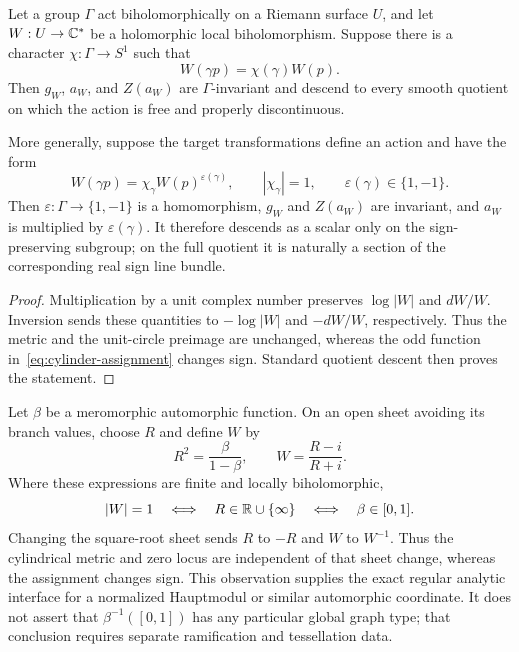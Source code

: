 \begin{proposition}
\label{prop:cylinder-automorphic-descent}
Let a group \(\Gamma\) act biholomorphically on a Riemann surface \(U\), and let
\(W:U\to\mathbb{C}^*\) be a holomorphic local biholomorphism.  Suppose there is a character
\(\chi:\Gamma\to S^1\) such that
\begin{equation}\label{eq:cylinder-unitary-automorphy}
 W(\gamma p)=\chi(\gamma)W(p).
\end{equation}
Then \(g_W\), \(a_W\), and \(Z(a_W)\) are \(\Gamma\)-invariant and descend to every
smooth quotient on which the action is free and properly discontinuous.

More generally, suppose the target transformations define an action and have the
form
\begin{equation}\label{eq:cylinder-dihedral-automorphy}
 W(\gamma p)=\chi_\gamma W(p)^{\varepsilon(\gamma)},
 \qquad
 |\chi_\gamma|=1,
 \qquad
 \varepsilon(\gamma)\in\{1,-1\}.
\end{equation}
Then \(\varepsilon:\Gamma\to\{1,-1\}\) is a homomorphism, \(g_W\) and
\(Z(a_W)\) are invariant, and \(a_W\) is multiplied by \(\varepsilon(\gamma)\).
It therefore descends as a scalar only on the sign-preserving subgroup; on the full
quotient it is naturally a section of the corresponding real sign line bundle.
\end{proposition}

\begin{proof}
Multiplication by a unit complex number preserves \(\log|W|\) and \(dW/W\).
Inversion sends these quantities to \(-\log|W|\) and \(-dW/W\), respectively.
Thus the metric and the unit-circle preimage are unchanged, whereas the odd
function in~\eqref{eq:cylinder-assignment} changes sign.  Standard quotient descent
then proves the statement.
\end{proof}

\begin{remark}
\label{rem:automorphic-interval-cayley}
Let \(\beta\) be a meromorphic automorphic function.  On an open sheet avoiding its
branch values, choose \(R\) and define \(W\) by
\begin{equation}\label{eq:automorphic-cayley-interface}
 R^2=\frac{\beta}{1-\beta},
 \qquad
 W=\frac{R-i}{R+i}.
\end{equation}
Where these expressions are finite and locally biholomorphic,
\begin{equation}\label{eq:automorphic-interval-zero-equivalence}
 |W|=1
 \quad\Longleftrightarrow\quad
 R\in\mathbb{R}\cup\{\infty\}
 \quad\Longleftrightarrow\quad
 \beta\in[0,1].
\end{equation}
Changing the square-root sheet sends \(R\) to \(-R\) and \(W\) to \(W^{-1}\).
Thus the cylindrical metric and zero locus are independent of that sheet change,
whereas the assignment changes sign.  This observation supplies the exact regular
analytic interface for a normalized Hauptmodul or similar automorphic coordinate.
It does not assert that \(\beta^{-1}([0,1])\) has any particular global graph type;
that conclusion requires separate ramification and tessellation data.
\end{remark}

